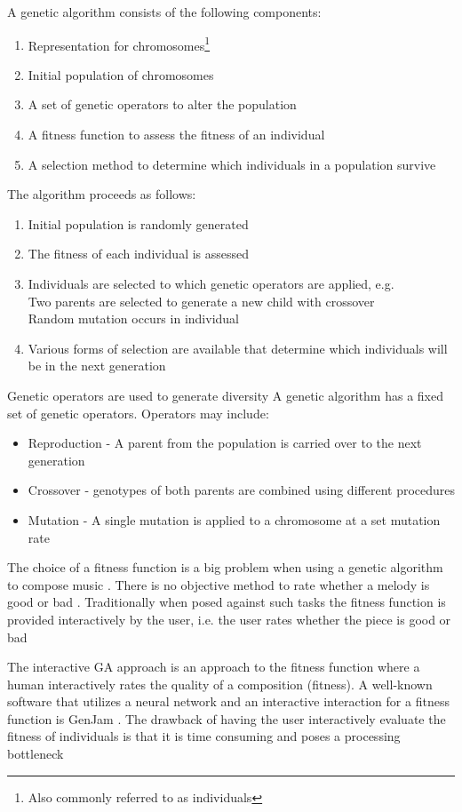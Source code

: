A genetic algorithm consists of the following components:
\begin{enumerate}
\item Representation for chromosomes\footnote{Also commonly referred to as individuals}
\item Initial population of chromosomes
\item A set of genetic operators to alter the population
\item A fitness function to assess the fitness of an individual
\item A selection method to determine which individuals in a population survive
\end{enumerate}
The algorithm proceeds as follows:
\begin{enumerate}
\item Initial population is randomly generated
\item The fitness of each individual is assessed
\item Individuals are selected to which genetic operators are applied, e.g.
\\Two parents are selected to generate a new child with crossover
\\Random mutation occurs in individual
\item Various forms of selection are available that determine which individuals will be in the next generation
\end{enumerate}

Genetic operators are used to generate diversity A genetic algorithm has a fixed set of genetic operators. Operators may include:
\begin{itemize}
\item Reproduction - A parent from the population is carried over to the next generation
\item Crossover - genotypes of both parents are combined using different procedures
\item Mutation - A single mutation is applied to a chromosome at a set mutation rate
\end{itemize}

The choice of a fitness function is a big problem when using a genetic algorithm to compose music \cite{Wiggins1998,Matic2010}. There is no objective method to rate whether a melody is good or bad \cite{Lo2012}. 
Traditionally when posed against such tasks the fitness function is provided interactively by the user, i.e. the user rates whether the piece is good or bad

The interactive GA approach is an approach to the fitness function where a human interactively rates the quality of a composition (fitness). A well-known software that utilizes a neural network and an interactive interaction for a fitness function is GenJam \cite{Biles1996}. The drawback of having the user interactively evaluate the fitness of individuals is that it is time consuming and poses a processing bottleneck \cite{Eck2002}

